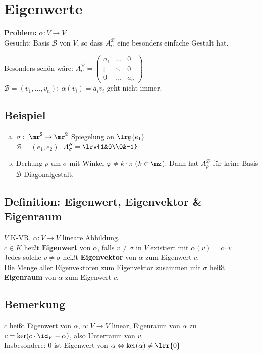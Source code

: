 \chapter{Eigenwerte}

  \textbf{Problem:} $\alpha:V\rightarrow V$\\
  Gesucht: Basis $\mathcal{B}$  von $V$, so dass $A_\alpha^{\mathcal{B}}$ eine
  besonders einfache Gestalt hat.

  Besonders schön wäre: $A_\alpha^{\mathcal{B}}=
  \begin{pmatrix}
    a_1&\dots&0\\
    \vdots&\ddots&0\\
    0&\dots&a_n
  \end{pmatrix}$\\
  $\mathcal{B}=(v_1,...,v_n):\ \alpha(v_i)=a_iv_i$ geht nicht immer.

\section{Beispiel}
  \begin{enumerate}[a)]
    \item $\sigma:\ \mr^2\rightarrow\mr^2$ Spiegelung an $\lrg{e_1}$\\
      $\mathcal{B}=(e_1,e_2)$. $A_\sigma^{\mathcal{B}}=\lrv{1&0\\0&-1}$
    \item Derhung $\rho$ um $\sigma$ mit Winkel $\varphi\neq k\cdot\pi$
      ($k\in\mz$). Dann hat $A_\rho^{\mathcal{B}}$ für keine Basis
      ${\mathcal{B}}$ Diagonalgestalt.
  \end{enumerate}

\section{Definition: Eigenwert, Eigenvektor \& Eigenraum}
  $V$ K-VR, $\alpha:V\rightarrow V$ lineare Abbildung.\\
  $c\in K$ heißt \textbf{Eigenwert} von $\alpha$, falls $v\neq\sigma$ in $V$
  existiert mit $\alpha(v)=c\cdot v$\\
  Jedes solche $v\neq\sigma$ heißt \textbf{Eigenvektor} von $\alpha$ zum
  Eigenwert $c$.\\
  Die Menge aller Eigenvektoren zum Eigenvektor zusammen mit $\sigma$ heißt
  \textbf{Eigenraum} von $\alpha$ zum Eigenwert $c$.

\section{Bemerkung}
  $c$ heißt Eigenwert von $\alpha$, $\alpha:V\rightarrow V$ linear, Eigenraum
  von $\alpha$ zu $c=\mbox{ker}(c\cdot\id_V-\alpha)$, also Unterraum von $v$.\\
  Insbesondere: $0$ ist Eigenwert von
  $\alpha\Leftrightarrow\mbox{ker}(\alpha)\neq\lrr{0}$

